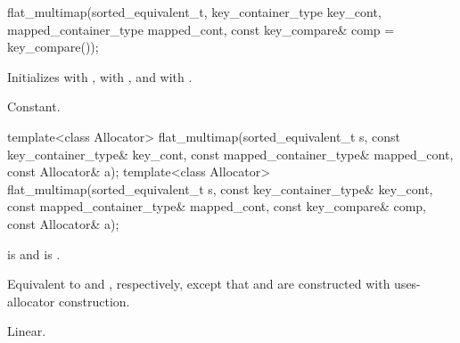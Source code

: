%
\begin{itemdecl}
flat_multimap(sorted_equivalent_t, key_container_type key_cont, mapped_container_type mapped_cont,
              const key_compare& comp = key_compare());
\end{itemdecl}

\begin{itemdescr}
\pnum
\effects
Initializes
 with ,
 with , and
 with .

\pnum
\complexity
Constant.
\end{itemdescr}

%
\begin{itemdecl}
template<class Allocator>
  flat_multimap(sorted_equivalent_t s, const key_container_type& key_cont,
                const mapped_container_type& mapped_cont, const Allocator& a);
template<class Allocator>
  flat_multimap(sorted_equivalent_t s, const key_container_type& key_cont,
                const mapped_container_type& mapped_cont, const key_compare& comp,
                const Allocator& a);
\end{itemdecl}

\begin{itemdescr}
\pnum
\constraints
{} is  and
 is .

\pnum
\effects
Equivalent to  and
, respectively,
except that  and  are constructed
with uses-allocator construction.

\pnum
\complexity
Linear.
\end{itemdescr}

